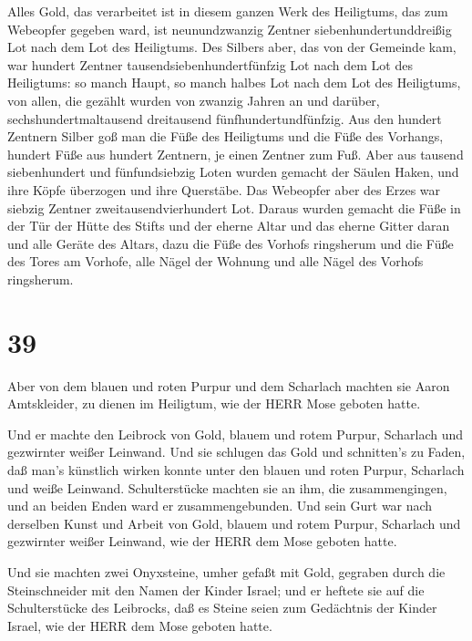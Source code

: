  Alles Gold, das verarbeitet ist in diesem ganzen Werk des
Heiligtums, das zum Webeopfer gegeben ward, ist neunundzwanzig Zentner
siebenhundertunddreißig Lot nach dem Lot des Heiligtums. 
Des Silbers aber, das von der Gemeinde kam, war hundert Zentner
tausendsiebenhundertfünfzig Lot nach dem Lot des Heiligtums:
 so manch Haupt, so manch halbes Lot nach dem Lot des
Heiligtums, von allen, die gezählt wurden von zwanzig Jahren an und
darüber, sechshundertmaltausend dreitausend fünfhundertundfünfzig.
 Aus den hundert Zentnern Silber goß man die Füße des
Heiligtums und die Füße des Vorhangs, hundert Füße aus hundert Zentnern,
je einen Zentner zum Fuß.  Aber aus tausend siebenhundert
und fünfundsiebzig Loten wurden gemacht der Säulen Haken, und ihre Köpfe
überzogen und ihre Querstäbe.  Das Webeopfer aber des Erzes
war siebzig Zentner zweitausendvierhundert Lot.  Daraus
wurden gemacht die Füße in der Tür der Hütte des Stifts und der eherne
Altar und das eherne Gitter daran und alle Geräte des Altars,
 dazu die Füße des Vorhofs ringsherum und die Füße des
Tores am Vorhofe, alle Nägel der Wohnung und alle Nägel des Vorhofs
ringsherum.

\hypertarget{section-38}{%
\section{39}\label{section-38}}

 Aber von dem blauen und roten Purpur und dem Scharlach
machten sie Aaron Amtskleider, zu dienen im Heiligtum, wie der HERR Mose
geboten hatte.

 Und er machte den Leibrock von Gold, blauem und rotem
Purpur, Scharlach und gezwirnter weißer Leinwand.  Und sie
schlugen das Gold und schnitten's zu Faden, daß man's künstlich wirken
konnte unter den blauen und roten Purpur, Scharlach und weiße Leinwand.
 Schulterstücke machten sie an ihm, die zusammengingen, und
an beiden Enden ward er zusammengebunden.  Und sein Gurt war
nach derselben Kunst und Arbeit von Gold, blauem und rotem Purpur,
Scharlach und gezwirnter weißer Leinwand, wie der HERR dem Mose geboten
hatte.

 Und sie machten zwei Onyxsteine, umher gefaßt mit Gold,
gegraben durch die Steinschneider mit den Namen der Kinder Israel;
 und er heftete sie auf die Schulterstücke des Leibrocks,
daß es Steine seien zum Gedächtnis der Kinder Israel, wie der HERR dem
Mose geboten hatte.

